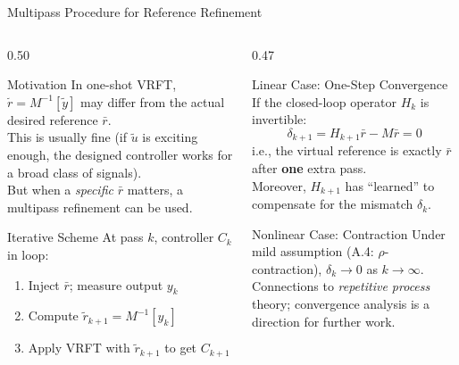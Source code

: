 \documentclass[aspectratio=169]{beamer}
\newcommand{\highlight}[1]{{\color{accentgreen!70!black}\textbf{#1}}}
\begin{document}
\begin{frame}{Multipass Procedure for Reference Refinement}
  \begin{columns}[T]
    \begin{column}{0.50\textwidth}
      \begin{block}{Motivation}
        In one-shot VRFT, $\tilde{r} = M^{-1}[\tilde{y}]$ may differ from the actual desired reference $\bar{r}$.\\[0.3em]
        This is usually fine (if $\tilde{u}$ is exciting enough, the designed controller works for a broad class of signals).\\[0.3em]
        But when a \emph{specific} $\bar{r}$ matters, a multipass refinement can be used.
      \end{block}
      \vspace{0.4em}
      \begin{block}{Iterative Scheme}
        At pass $k$, controller $C_k$ in loop:
        \begin{enumerate}
          \item Inject $\bar{r}$; measure output $y_k$
          \item Compute $\tilde{r}_{k+1} = M^{-1}[y_k]$
          \item Apply VRFT with $\tilde{r}_{k+1}$ to get $C_{k+1}$
        \end{enumerate}
      \end{block}
    \end{column}
    \begin{column}{0.47\textwidth}
      \begin{exampleblock}{Linear Case: One-Step Convergence}
        If the closed-loop operator $H_k$ is invertible:
        \[
          \delta_{k+1} = H_{k+1}\bar{r} - M\bar{r} = 0
        \]
        i.e., the virtual reference is exactly $\bar{r}$ after \highlight{one} extra pass.\\[0.3em]
        Moreover, $H_{k+1}$ has ``learned'' to compensate for the mismatch $\delta_k$.
      \end{exampleblock}
      \vspace{0.3em}
      \begin{block}{Nonlinear Case: Contraction}
        Under mild assumption (A.4: $\rho$-contraction), $\delta_k \to 0$ as $k \to \infty$.\\[0.3em]
        Connections to \emph{repetitive process} theory; convergence analysis is a direction for further work.
      \end{block}
    \end{column}
  \end{columns}
\end{frame}
\end{document}
